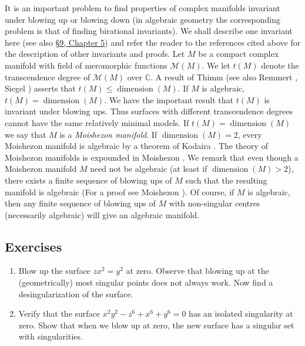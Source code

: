 It is an important problem to find properties of complex manifolds invariant under blowing up or blowing down (in algebraic geometry the corresponding problem is that of finding birational invariants). We shall describe one invariant here (see also \hyperref[sec:5:9]{\S9, Chapter 5}) and refer the reader to the references cited above for the description of other invariants and proofs. Let $M$ be a compact complex manifold with field of meromorphic functions $\mathcal M(M)$. We let $t(M)$ denote the transcendence degree of $\mathcal M(M)$ over $\mathbb C$. A result of Thimm \cite{bib:I:thimm-w:1} (see also Remmert \cite{bib:I:remmert-r:1}, Siegel \cite{bib:I:siegel-c-l:2}) asserts that
$t(M)\leq\operatorname{dimension}(M)$. If $M$ is algebraic, $t(M)=\operatorname{dimension}(M)$. We have the important result that $t(M)$ is invariant under blowing ups. Thus surfaces with different transcendence degrees cannot have the same relatively minimal models. If $t(M)=\operatorname{dimension}(M)$ we say that $M$ is a \emph{Moishezon manifold}. If $\operatorname{dimension}(M)=2$, every Moishezon manifold is algebraic by a theorem of Kodaira \cite{bib:I:kodaira-k:2}. The theory of Moishezon manifolds is expounded in Moishezon \cite{bib:I:moishezon-b-g:1}. We remark that even though a Moishezon manifold $M$ need not be algebraic (at least if $\operatorname{dimension}(M)>2$), there exists a finite sequence of blowing ups of $M$ such that the resulting manifold is algebraic (For a proof see Moishezon \cite[Chapter 2]{bib:I:moishezon-b-g:1}). Of course, if $M$ is algebraic, then any finite sequence of blowing ups of $M$ with non-singular centres (necessarily algebraic) will give an algebraic manifold.

\subsection*{Exercises}
\begin{enumerate}
\item Blow up the surface $zx^2=y^2$ at zero. Observe that blowing up at the (geometrically) most singular points does not always work. Now find a desingularization of the surface.
\item Verify that the surface $x^2y^2-z^6+x^6+y^6=0$ has an isolated singularity at zero. Show that when we blow up at zero, the new surface has a singular set with singularities.
\end{enumerate}
